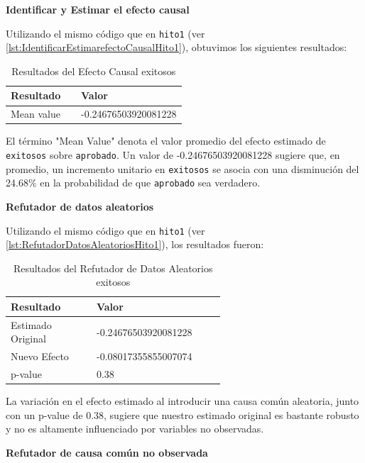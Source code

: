 \textbf{Identificar y Estimar el efecto causal}

Utilizando el mismo código que en \texttt{hito1} (ver \ref{lst:IdentificarEstimarefectoCausalHito1}), obtuvimos los siguientes resultados:

\begin{table}[H]
    \centering        
    \begin{tabular}{lp{0.6\linewidth}}
        \toprule
        \textbf{Resultado} & \textbf{Valor} \\
        \midrule
        Mean value & -0.24676503920081228 \\
        \bottomrule
    \end{tabular}
    \caption{Resultados del Efecto Causal exitosos}
    \label{tab:efecto_causal_exitosos}
\end{table}

El término "Mean Value" denota el valor promedio del efecto estimado de \texttt{exitosos} sobre \texttt{aprobado}. Un valor de -0.24676503920081228 sugiere que, en promedio, un incremento unitario en \texttt{exitosos} se asocia con una disminución del 24.68\% en la probabilidad de que \texttt{aprobado} sea verdadero.

\textbf{Refutador de datos aleatorios}

Utilizando el mismo código que en \texttt{hito1} (ver \ref{lst:RefutadorDatosAleatoriosHito1}), los resultados fueron:

\begin{table}[H]
    \centering        
    \begin{tabular}{lp{0.6\linewidth}}
        \toprule
        \textbf{Resultado} & \textbf{Valor} \\
        \midrule
        Estimado Original & -0.24676503920081228 \\
        Nuevo Efecto & -0.08017355855007074 \\
        p-value & 0.38 \\
        \bottomrule
    \end{tabular}
    \caption{Resultados del Refutador de Datos Aleatorios exitosos}
    \label{tab:refutador_datos_aleatorios_exitosos}
\end{table}

La variación en el efecto estimado al introducir una causa común aleatoria, junto con un p-value de 0.38, sugiere que nuestro estimado original es bastante robusto y no es altamente influenciado por variables no observadas.

\textbf{Refutador de causa común no observada}

